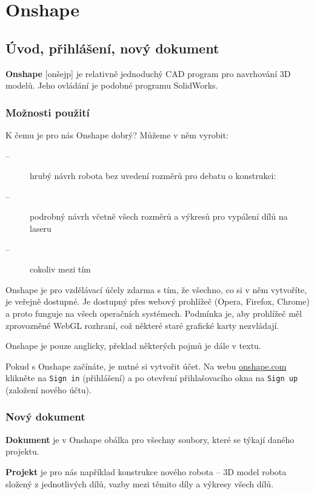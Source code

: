 
\section{Onshape}

\subsection{Úvod, přihlášení, nový dokument}

\textbf{Onshape} 
 [onšejp] je relativně jednoduchý CAD program pro navrhování 3D modelů. Jeho ovládání je podobné programu SolidWorks. 
 
 \subsubsection{Možnosti použití}
 
 K čemu je pro nás Onshape dobrý? Můžeme v něm vyrobit: 
 
 \begin{description}
 	\item[--] hrubý návrh robota bez uvedení rozměrů pro debatu o konstrukci: 
 	\item[--] podrobný návrh včetně všech rozměrů a výkresů pro vypálení dílů na laseru  
 	\item[--] cokoliv mezi tím
 \end{description}
 
 
Onshape je pro vzdělávací účely zdarma s tím, že všechno, co si v něm vytvoříte, je veřejně dostupné. 
Je dostupný přes webový prohlížeč (Opera, Firefox, Chrome) a proto funguje na všech operačních systémech. 
Podmínka je, aby prohlížeč měl zprovozněné WebGL rozhraní, což některé staré grafické karty nezvládají. 

Onshape je pouze anglicky, překlad některých pojmů je dále v textu.

Pokud s Onshape začínáte, je nutné si vytvořit účet. 
Na webu \url{onshape.com} klikněte na {\tt Sign in} (přihlášení) a po otevření přihlašovacího okna na {\tt Sign up} (založení nového účtu).


\subsubsection{Nový dokument}


\textbf{Dokument} je v Onshape obálka pro všechny soubory, které se týkají daného projektu. 

 \textbf{Projekt} je pro nás například konstrukce nového robota -- 3D model robota složený z jednotlivých dílů, vazby mezi těmito díly a výkresy všech dílů. 
 
